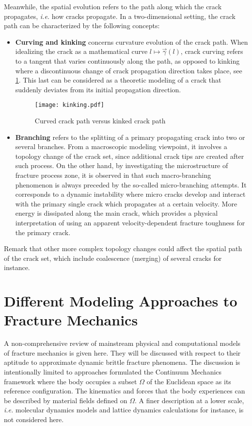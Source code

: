 Meanwhile, the spatial evolution refers to the path along which the crack propagates, \emph{i.e.} how cracks propagate. In a two-dimensional setting, the crack path can be characterized by the following concepts:
\begin{itemize}
\item \textbf{Curving and kinking} concerns curvature evolution of the crack path. When idealizing the crack as a mathematical curve $l\mapsto\vec{\gamma}(l)$, crack curving refers to a tangent that varies continuously along the path, as opposed to kinking where a discontinuous change of crack propagation direction takes place, see \cref{fig:kink}. This last can be considered as a theoretic modeling of a crack that suddenly deviates from its initial propagation direction.
\begin{figure}[htbp]
\centering
\texttt{[image: kinking.pdf]}
\caption{Curved crack path versus kinked crack path} \label{fig:kink}
\end{figure}

\item \textbf{Branching} refers to the splitting of a primary propagating crack into two or several branches. From a macroscopic modeling viewpoint, it involves a topology change of the crack set, since additional crack tips are created after such process. On the other hand, by investigating the microstructure of fracture process zone, it is observed in \cite{Ravi-ChandarKnauss:1984,Ravi-ChandarKnauss:1984a} that such macro-branching phenomenon is always preceded by the so-called micro-branching attempts. It corresponds to a dynamic instability \cite{FinebergMarder:1999} where micro cracks develop and interact with the primary single crack which propagates at a certain velocity. More energy is dissipated along the main crack, which provides a physical interpretation of using an apparent velocity-dependent fracture toughness for the primary crack.
\end{itemize}
Remark that other more complex topology changes could affect the spatial path of the crack set, which include coalescence (merging) of several cracks for instance.

\section{Different Modeling Approaches to Fracture Mechanics} \label{sec:discretemodels}
A non-comprehensive review of mainstream physical and computational models of fracture mechanics is given here. They will be discussed with respect to their aptitude to approximate dynamic brittle fracture phenomena. The discussion is intentionally limited to approaches formulated the Continuum Mechanics framework where the body occupies a subset $\Omega$ of the Euclidean space as its reference configuration. The kinematics and forces that the body experiences can be described by material fields defined on $\Omega$. A finer description at a lower scale, \emph{i.e.} molecular dynamics models \cite{AbrahamBrodbeckRafeyRudge:1994} and lattice dynamics calculations \cite{MarderGross:1995} for instance, is not considered here.

